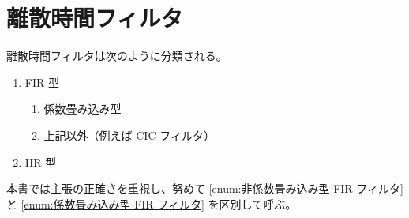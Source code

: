 \chapter{離散時間フィルタ}
    離散時間フィルタは次のように分類される。
    \begin{enumerate}
        \item FIR 型
        \begin{enumerate}
            \item 係数畳み込み型 \label{enum:係数畳み込み型 FIR フィルタ}
            \item 上記以外（例えば CIC フィルタ） \label{enum:非係数畳み込み型 FIR フィルタ}
        \end{enumerate}
        \item IIR 型
    \end{enumerate}
    本書では主張の正確さを重視し、努めて \ref{enum:非係数畳み込み型 FIR フィルタ} と \ref{enum:係数畳み込み型 FIR フィルタ} を区別して呼ぶ。
    
    
    
